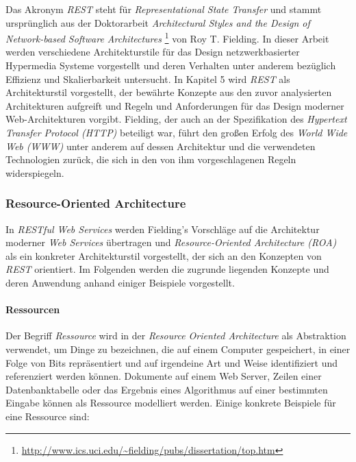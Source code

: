 Das Akronym \textit{REST} steht für \textit{Representational State
  Transfer} und stammt ursprünglich aus der Doktorarbeit
\textit{Architectural Styles and the Design of Network-based Software
  Architectures} \cite{Fielding2000}
\footnote{\url{http://www.ics.uci.edu/~fielding/pubs/dissertation/top.htm}}
von Roy T. Fielding. In dieser Arbeit werden verschiedene
Architekturstile für das Design netzwerkbasierter Hypermedia Systeme
vorgestellt und deren Verhalten unter anderem bezüglich Effizienz und
Skalierbarkeit untersucht. In Kapitel 5 wird \textit{REST} als
Architekturstil vorgestellt, der bewährte Konzepte aus den zuvor
analysierten Architekturen aufgreift und Regeln und Anforderungen für
das Design moderner Web-Architekturen vorgibt. Fielding, der auch an
der Spezifikation des \textit{Hypertext Transfer Protocol (HTTP)}
 beteiligt war, führt
den großen Erfolg des \textit{World Wide Web (WWW)}
 unter anderem auf dessen
Architektur und die verwendeten Technologien zurück, die sich in den
von ihm vorgeschlagenen Regeln widerspiegeln.

\subsubsection{Resource-Oriented Architecture}

In \textit{RESTful Web Services} \cite{Richardson07} werden Fielding's
Vorschläge auf die Architektur moderner \textit{Web Services}
übertragen und \textit{Resource-Oriented Architecture (ROA)} als ein
konkreter Architekturstil vorgestellt, der sich an den Konzepten von
\textit{REST} orientiert. Im Folgenden werden die zugrunde liegenden
Konzepte und deren Anwendung anhand einiger Beispiele vorgestellt.

\paragraph{Ressourcen}
Der Begriff \textit{Ressource} wird in der \textit{Resource Oriented
  Architecture} als Abstraktion verwendet, um Dinge zu bezeichnen, die
auf einem Computer gespeichert, in einer Folge von Bits repräsentiert
und auf irgendeine Art und Weise identifiziert und referenziert werden
können. Dokumente auf einem Web Server, Zeilen einer Datenbanktabelle
oder das Ergebnis eines Algorithmus auf einer bestimmten Eingabe
können als Ressource modelliert werden. Einige konkrete Beispiele für
eine Ressource sind:


